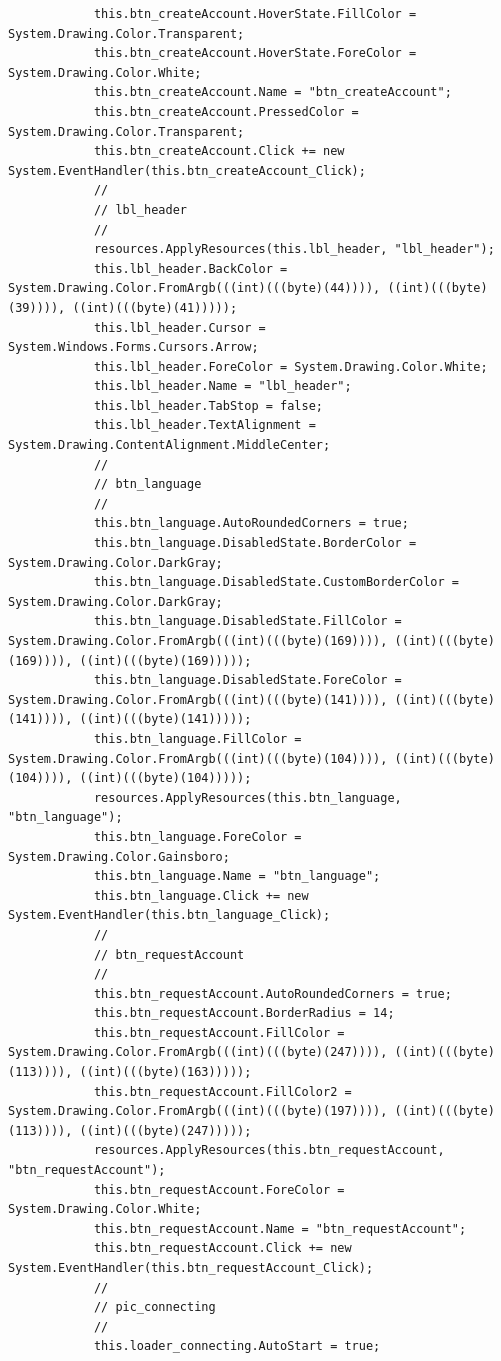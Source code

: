 \documentclass{article}
\begin{document}
\begin{verbatim}
			this.btn_createAccount.HoverState.FillColor = System.Drawing.Color.Transparent;
			this.btn_createAccount.HoverState.ForeColor = System.Drawing.Color.White;
			this.btn_createAccount.Name = "btn_createAccount";
			this.btn_createAccount.PressedColor = System.Drawing.Color.Transparent;
			this.btn_createAccount.Click += new System.EventHandler(this.btn_createAccount_Click);
			// 
			// lbl_header
			// 
			resources.ApplyResources(this.lbl_header, "lbl_header");
			this.lbl_header.BackColor = System.Drawing.Color.FromArgb(((int)(((byte)(44)))), ((int)(((byte)(39)))), ((int)(((byte)(41)))));
			this.lbl_header.Cursor = System.Windows.Forms.Cursors.Arrow;
			this.lbl_header.ForeColor = System.Drawing.Color.White;
			this.lbl_header.Name = "lbl_header";
			this.lbl_header.TabStop = false;
			this.lbl_header.TextAlignment = System.Drawing.ContentAlignment.MiddleCenter;
			// 
			// btn_language
			// 
			this.btn_language.AutoRoundedCorners = true;
			this.btn_language.DisabledState.BorderColor = System.Drawing.Color.DarkGray;
			this.btn_language.DisabledState.CustomBorderColor = System.Drawing.Color.DarkGray;
			this.btn_language.DisabledState.FillColor = System.Drawing.Color.FromArgb(((int)(((byte)(169)))), ((int)(((byte)(169)))), ((int)(((byte)(169)))));
			this.btn_language.DisabledState.ForeColor = System.Drawing.Color.FromArgb(((int)(((byte)(141)))), ((int)(((byte)(141)))), ((int)(((byte)(141)))));
			this.btn_language.FillColor = System.Drawing.Color.FromArgb(((int)(((byte)(104)))), ((int)(((byte)(104)))), ((int)(((byte)(104)))));
			resources.ApplyResources(this.btn_language, "btn_language");
			this.btn_language.ForeColor = System.Drawing.Color.Gainsboro;
			this.btn_language.Name = "btn_language";
			this.btn_language.Click += new System.EventHandler(this.btn_language_Click);
			// 
			// btn_requestAccount
			// 
			this.btn_requestAccount.AutoRoundedCorners = true;
			this.btn_requestAccount.BorderRadius = 14;
			this.btn_requestAccount.FillColor = System.Drawing.Color.FromArgb(((int)(((byte)(247)))), ((int)(((byte)(113)))), ((int)(((byte)(163)))));
			this.btn_requestAccount.FillColor2 = System.Drawing.Color.FromArgb(((int)(((byte)(197)))), ((int)(((byte)(113)))), ((int)(((byte)(247)))));
			resources.ApplyResources(this.btn_requestAccount, "btn_requestAccount");
			this.btn_requestAccount.ForeColor = System.Drawing.Color.White;
			this.btn_requestAccount.Name = "btn_requestAccount";
			this.btn_requestAccount.Click += new System.EventHandler(this.btn_requestAccount_Click);
			// 
			// pic_connecting
			// 
			this.loader_connecting.AutoStart = true;

\end{verbatim}
\end{document}
